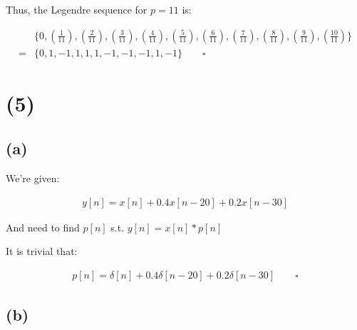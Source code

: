 \documentclass{article}
\begin{document}
Thus, the Legendre sequence for $p = 11$ is:

\begin{align*}
    &\{0, \left(\frac{1}{11}\right), \left(\frac{2}{11}\right), \left(\frac{3}{11}\right), \left(\frac{4}{11}\right), \left(\frac{5}{11}\right), \left(\frac{6}{11}\right), \left(\frac{7}{11}\right), \left(\frac{8}{11}\right), \left(\frac{9}{11}\right), \left(\frac{10}{11}\right)\} \\
    =& \{0, 1, -1, 1, 1, 1, -1, -1, -1, 1, -1\} \qquad \square
\end{align*}

\section*{(5)}

\subsection*{(a)}

We're given:

\begin{align*}
    y[n] = x[n] + 0.4x[n-20] + 0.2x[n-30]
\end{align*}

And need to find $p[n]$ s.t. $y[n] = x[n] * p[n]$
\bigskip

It is trivial that:

\begin{align*}
    p[n] = \delta[n] + 0.4\delta[n-20] + 0.2\delta[n-30] \qquad \square
\end{align*}

\subsection*{(b)}






\end{document}
